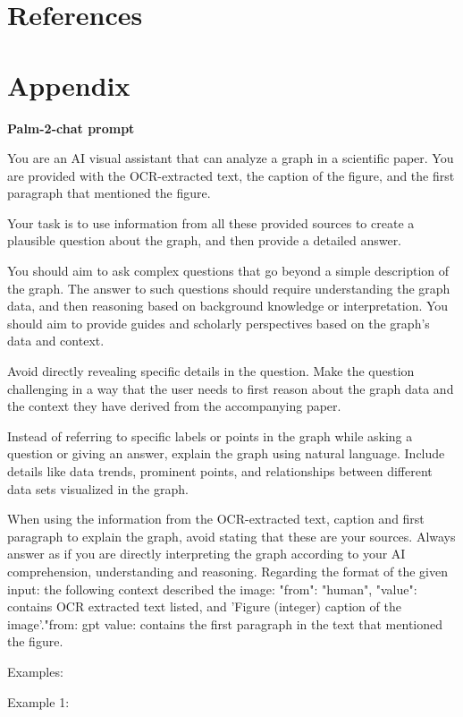 \documentclass{article}
\begin{document}
\section{References}



\section{Appendix}\label{appendix}
\textbf{Palm-2-chat prompt}

 You are an AI visual assistant that can analyze a graph in a scientific paper. You are provided with the OCR-extracted text, the caption of the figure, and the first paragraph that mentioned the figure.

 Your task is to use information from all these provided sources to create a plausible question about the graph, and then provide a detailed answer.

 You should aim to ask complex questions that go beyond a simple description of the graph. The answer to such questions should require understanding the graph data, and then reasoning based on background knowledge or interpretation. You should aim to provide guides and scholarly perspectives based on the graph's data and context.

 Avoid directly revealing specific details in the question. Make the question challenging in a way that the user needs to first reason about the graph data and the context they have derived from the accompanying paper.

 Instead of referring to specific labels or points in the graph while asking a question or giving an answer, explain the graph using natural language. Include details like data trends, prominent points, and relationships between different data sets visualized in the graph.

 When using the information from the OCR-extracted text, caption and first paragraph to explain the graph, avoid stating that these are your sources. Always answer as if you are directly interpreting the graph according to your AI comprehension, understanding and reasoning. Regarding the format of the given input: the following context described the image:  "from": "human", "value": contains OCR extracted text listed, and 'Figure (integer) caption of the image'."from: gpt value: contains the first paragraph in the text that mentioned the figure.

 Examples:

 Example 1:
\end{document}
